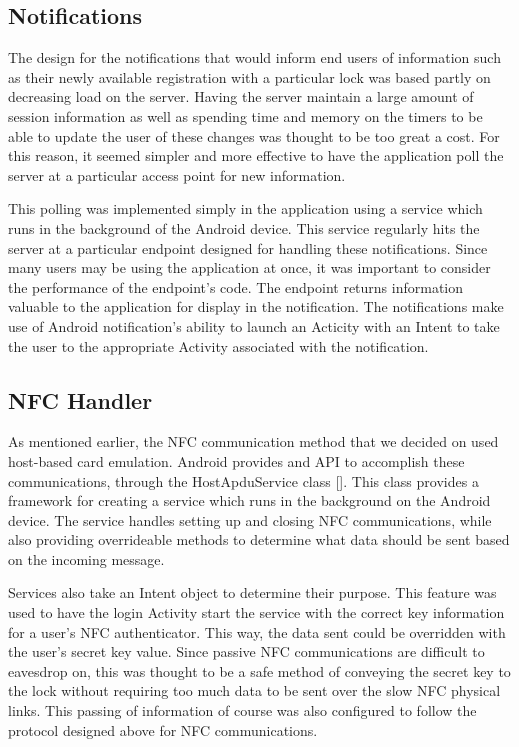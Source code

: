 \documentclass[12pt]{report}
\begin{document}

\subsection{Notifications}

The design for the notifications that would inform end users of information such as their newly available registration
with a particular lock was based partly on decreasing load on the server. Having the server maintain a large amount of
session information as well as spending time and memory on the timers to be able to update the user of these changes
was thought to be too great a cost. For this reason, it seemed simpler and more effective to have the application poll
the server at a particular access point for new information.

This polling was implemented simply in the application using a service which runs in the background of the Android
device. This service regularly hits the server at a particular endpoint designed for handling these notifications. Since
many users may be using the application at once, it was important to consider the performance of the endpoint's code.
The endpoint returns information valuable to the application for display in the notification. The notifications make use
of Android notification's ability to launch an Acticity with an Intent to take the user to the appropriate Activity
associated with the notification.


\subsection{NFC Handler}

As mentioned earlier, the NFC communication method that we decided on used host-based card emulation. Android provides
and API to accomplish these communications, through the HostApduService class []. This class provides a framework for
creating a service which runs in the background on the Android device. The service handles setting up and closing NFC
communications, while also providing overrideable methods to determine what data should be sent based on the incoming
message.

Services also take an Intent object to determine their purpose. This feature was used to have the login Activity start
the service with the correct key information for a user's NFC authenticator. This way, the data sent could be overridden
with the user's secret key value. Since passive NFC communications are difficult to eavesdrop on, this was thought to be
a safe method of conveying the secret key to the lock without requiring too much data to be sent over the slow NFC
physical links. This passing of information of course was also configured to follow the protocol designed above for NFC
communications.
\end{document}
